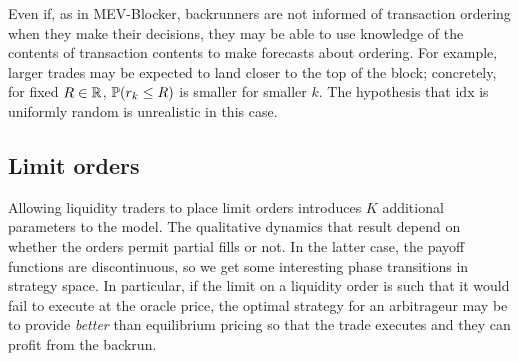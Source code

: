 \begin{remark}

  Even if, as in MEV-Blocker, backrunners are not informed of transaction ordering when they make their decisions, they may be able to use knowledge of the contents of transaction contents to make forecasts about ordering. 
  For example, larger trades may be expected to land closer to the top of the block; concretely, for fixed $R\in\mathbb R$, $\mathbb{P}(r_k\leq R)$ is smaller for smaller $k$.
  The hypothesis that $\mathrm{idx}$ is uniformly random is unrealistic in this case.

\end{remark}


\begin{comment}
\subsection{The free game as a decentralised limit}\label{decentralized-limit}

The free game models the situation where each agent has a strategy of
horizon of one slot. That is, for each player \(X\), given that \(X\) is
allocated at least one slot, \(X\) is almost surely allocated exactly
one slot. This approximates a limit of games whose allocation function
\(\phi\) is distributed as a product of uniform distributions as
\(N\rightarrow\infty\) (or at least whose point masses are
\(\mathcal{O}(N)\)).
\end{comment}

\subsection{Limit orders}

Allowing liquidity traders to place limit orders introduces $K$ additional parameters to the model.
%
The qualitative dynamics that result depend on whether the orders permit partial fills or not.
%
In the latter case, the payoff functions are discontinuous, so we get some interesting phase transitions in strategy space.
%
In particular, if the limit on a liquidity order is such that it would fail to execute at the oracle price, the optimal strategy for an arbitrageur may be to provide \emph{better} than equilibrium pricing so that the trade executes and they can profit from the backrun.

